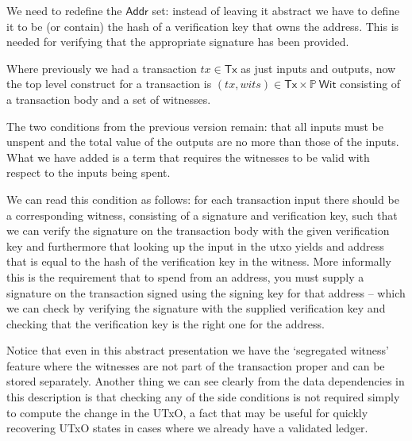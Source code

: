 \documentclass[11pt,a4paper]{article}
\newcommand{\powerset}[1]{\mathbb{P}~#1}
\newcommand{\var}[1]{\mathit{#1}}
\newcommand{\type}[1]{\mathsf{#1}}
\begin{document}
We need to redefine the $\type{Addr}$ set: instead of leaving it abstract we
have to define it to be (or contain) the hash of a verification key that owns
the address. This is needed for verifying that the appropriate signature has
been provided.

Where previously we had a transaction $\var{tx} \in \type{Tx}$ as just inputs
and outputs, now the top level construct for a transaction is
$(\var{tx}, \var{wits}) \in \type{Tx} \times \powerset{\type{Wit}}$ consisting
of a transaction body and a set of witnesses.

The two conditions from the previous version remain: that all inputs must be
unspent and the total value of the outputs are no more than those of the inputs.
What we have added is a term that requires the witnesses to be valid with
respect to the inputs being spent.

We can read this condition as follows: for each transaction input there should
be a corresponding witness, consisting of a signature and verification key,
such that we can verify the signature on the transaction body with the given
verification key and furthermore that looking up the input in the utxo yields
and address that is equal to the hash of the verification key in the witness.
More informally this is the requirement that to spend from an address, you
must supply a signature on the transaction signed using the signing key for
that address -- which we can check by verifying the signature with the
supplied verification key and checking that the verification key is the right
one for the address.

Notice that even in this abstract presentation we have the `segregated witness'
feature where the witnesses are not part of the transaction proper and can be
stored separately. Another thing we can see clearly from the data dependencies
in this description is that checking any of the side conditions is not required
simply to compute the change in the UTxO, a fact that may be useful for quickly
recovering UTxO states in cases where we already have a validated ledger.
\end{document}
